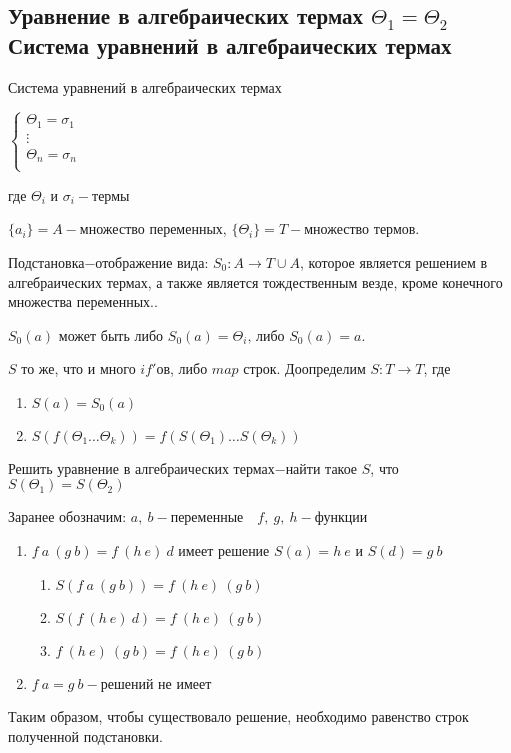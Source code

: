 	\subsection{Уравнение в алгебраических термах $\Theta_1=\Theta_2$\\Система уравнений в алгебраических термах}
	\begin{definition}Система уравнений в алгебраических термах\end{definition}
	$
		\begin{cases}
			\Theta_1=\sigma_1&\\
			\vdots&\\
			\Theta_n=\sigma_n&\\
		\end{cases}
	$\par где $\Theta_i \text{ и } \sigma_i-\text{термы}$\par
	\begin{definition}$\{a_i\}=A-$множество переменных, $\{\Theta_i\}=T-$множество термов.\end{definition}
	\begin{definition}Подстановка$-$отображение вида: $S_0:A\to T\cup A$, которое является решением в алгебраических термах, а также является тождественным везде, кроме конечного множества переменных..\par $S_0(a)$ может быть либо $S_0(a)=\Theta_i\text{, либо }S_0(a)=a$.\end{definition} 
	$S$ то же, что и много $if'$ов, либо $map$ строк. Доопределим $S:T\to T$, где \begin{enumerate}
		\item $S(a)=S_0(a)$
		\item $S(f(\Theta_1 \ldots \Theta_k))=f(S(\Theta_1) \ldots S(\Theta_k))$
	\end{enumerate}
	
	\begin{definition}Решить уравнение в алгебраических термах$-$найти такое $S$, что $S(\Theta_1)=S(\Theta_2)$\end{definition} 

	\begin{example}\end{example}
		Заранее обозначим: $a,\:b-\text{переменные}\hspace{1em} f,\:g,\:h-\text{функции}$
		\begin{enumerate}
			\item $f\:a\:(g\:b)=f\:(h\:e)\:d$ имеет решение $S(a)=h\:e\text{ и }S(d)=g\:b$
				\begin{enumerate}
					\item $S(f\:a\:(g\:b))=f\:(h\:e)\:(g\:b)$
					\item $S(f\:(h\:e)\:d)=f\:(h\:e)\:(g\:b)$
					\item $f\:(h\:e)\:(g\:b)=f\:(h\:e)\:(g\:b)$
				\end{enumerate}
			\item $f\:a=g\:b-$решений не имеет
		\end{enumerate}
		Таким образом, чтобы существовало решение, необходимо равенство строк полученной подстановки.\par
